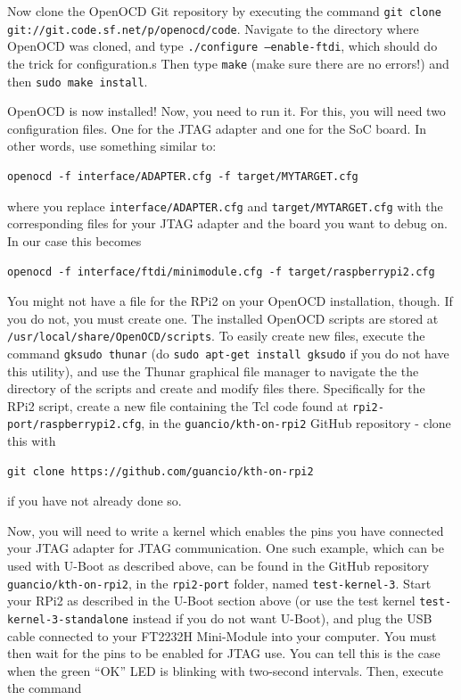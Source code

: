 \documentclass[a4paper,11pt,reqno]{amsart}
\begin{document}
{Now clone the OpenOCD Git repository by executing the command \texttt{git clone git://git.code.sf.net/p/openocd/code}. Navigate to the directory where OpenOCD was cloned, and type \texttt{./configure --enable-ftdi}, which should do the trick for configuration.s Then type \texttt{make} (make sure there are no errors!) and then \texttt{sudo make install}.

OpenOCD is now installed! Now, you need to run it. For this, you will need two configuration files. One for the JTAG adapter and one for the SoC board. In other words, use something similar to:

\begin{verbatim}
openocd -f interface/ADAPTER.cfg -f target/MYTARGET.cfg
\end{verbatim}

where you replace \texttt{interface/ADAPTER.cfg} and \texttt{target/MYTARGET.cfg} with the corresponding files for your JTAG adapter and the board you want to debug on. In our case this becomes

\begin{verbatim}
openocd -f interface/ftdi/minimodule.cfg -f target/raspberrypi2.cfg
\end{verbatim}

You might not have a file for the RPi2 on your OpenOCD installation, though. If you do not, you must create one. The installed OpenOCD scripts are stored at \texttt{/usr/local/share/OpenOCD/scripts}. To easily create new files, execute the command \texttt{gksudo thunar} (do \texttt{sudo apt-get install gksudo} if you do not have this utility), and use the Thunar graphical file manager to navigate the the directory of the scripts and create and modify files there. Specifically for the RPi2 script, create a new file containing the Tcl code found at \texttt{rpi2-port/raspberrypi2.cfg}, in the \texttt{guancio/kth-on-rpi2} GitHub repository - clone this with

\begin{verbatim}
git clone https://github.com/guancio/kth-on-rpi2
\end{verbatim}

if you have not already done so.

Now, you will need to write a kernel which enables the pins you have connected your JTAG adapter for JTAG communication. One such example, which can be used with U-Boot as described above, can be found in the GitHub repository \texttt{guancio/kth-on-rpi2}, in the \texttt{rpi2-port} folder, named \texttt{test-kernel-3}. Start your RPi2 as described in the U-Boot section above (or use the test kernel \texttt{test-kernel-3-standalone} instead if you do not want U-Boot), and plug the USB cable connected to your FT2232H Mini-Module into your computer. You must then wait for the pins to be enabled for JTAG use. You can tell this is the case when the green ``OK'' LED is blinking with two-second intervals. Then, execute the command

}
\end{document}
